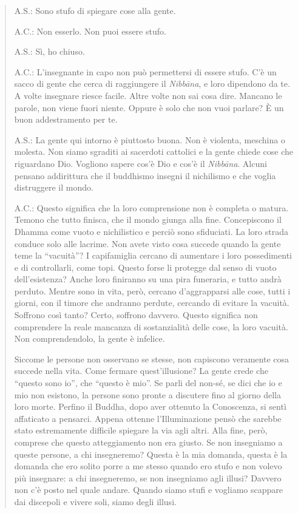 \begin{quote}
A.S.: Sono stufo di spiegare cose alla gente.

A.C.: Non esserlo. Non puoi essere stufo.

A.S.: Sì, ho chiuso.

A.C.: L'insegnante in capo non può permettersi di essere stufo. C'è un
sacco di gente che cerca di raggiungere il \emph{Nibbāna}, e loro
dipendono da te. A volte insegnare riesce facile. Altre volte non sai
cosa dire. Mancano le parole, non viene fuori niente. Oppure è solo che
non vuoi parlare? È un buon addestramento per te.

A.S.: La gente qui intorno è piuttosto buona. Non è violenta, meschina o
molesta. Non siamo sgraditi ai sacerdoti cattolici e la gente chiede
cose che riguardano Dio. Vogliono sapere cos'è Dio e cos'è il
\emph{Nibbāna}. Alcuni pensano addirittura che il buddhismo insegni il
nichilismo e che voglia distruggere il mondo.

A.C.: Questo significa che la loro comprensione non è completa o matura.
Temono che tutto finisca, che il mondo giunga alla fine. Concepiscono il
Dhamma come vuoto e nichilistico e perciò sono sfiduciati. La loro
strada conduce solo alle lacrime. Non avete visto cosa succede quando la
gente teme la ``vacuità''? I capifamiglia cercano di aumentare i loro
possedimenti e di controllarli, come topi. Questo forse li protegge dal
senso di vuoto dell'esistenza? Anche loro finiranno su una pira
funeraria, e tutto andrà perduto. Mentre sono in vita, però, cercano
d'aggrapparsi alle cose, tutti i giorni, con il timore che andranno
perdute, cercando di evitare la vacuità. Soffrono così tanto? Certo,
soffrono davvero. Questo significa non comprendere la reale mancanza di
sostanzialità delle cose, la loro vacuità. Non comprendendolo, la gente
è infelice.

Siccome le persone non osservano se stesse, non capiscono veramente cosa
succede nella vita. Come fermare quest'illusione? La gente crede che
``questo sono io'', che ``questo è mio''. Se parli del non-sé, se dici
che io e mio non esistono, la persone sono pronte a discutere fino al
giorno della loro morte. Perfino il Buddha, dopo aver ottenuto la
Conoscenza, si sentì affaticato a pensarci. Appena ottenne
l'Illuminazione pensò che sarebbe stato estremamente difficile spiegare
la via agli altri. Alla fine, però, comprese che questo atteggiamento
non era giusto. Se non insegniamo a queste persone, a chi insegneremo?
Questa è la mia domanda, questa è la domanda che ero solito porre a me
stesso quando ero stufo e non volevo più insegnare: a chi insegneremo,
se non insegniamo agli illusi? Davvero non c'è posto nel quale andare.
Quando siamo stufi e vogliamo scappare dai discepoli e vivere soli,
siamo degli illusi.
\end{quote}

